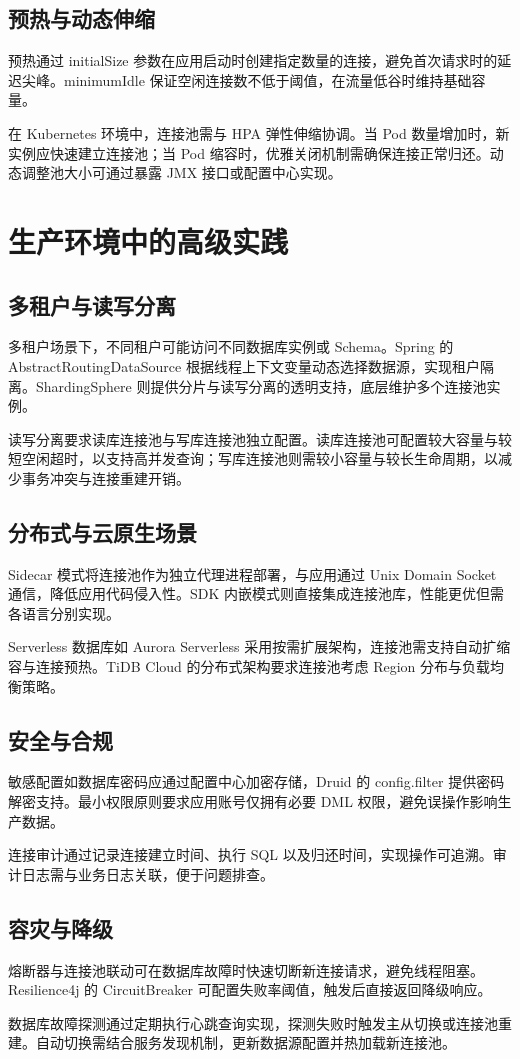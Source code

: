 \section{预热与动态伸缩}
预热通过 initialSize 参数在应用启动时创建指定数量的连接，避免首次请求时的延迟尖峰。minimumIdle 保证空闲连接数不低于阈值，在流量低谷时维持基础容量。\par
在 Kubernetes 环境中，连接池需与 HPA 弹性伸缩协调。当 Pod 数量增加时，新实例应快速建立连接池；当 Pod 缩容时，优雅关闭机制需确保连接正常归还。动态调整池大小可通过暴露 JMX 接口或配置中心实现。\par
\chapter{生产环境中的高级实践}
\section{多租户与读写分离}
多租户场景下，不同租户可能访问不同数据库实例或 Schema。Spring 的 AbstractRoutingDataSource 根据线程上下文变量动态选择数据源，实现租户隔离。ShardingSphere 则提供分片与读写分离的透明支持，底层维护多个连接池实例。\par
读写分离要求读库连接池与写库连接池独立配置。读库连接池可配置较大容量与较短空闲超时，以支持高并发查询；写库连接池则需较小容量与较长生命周期，以减少事务冲突与连接重建开销。\par
\section{分布式与云原生场景}
Sidecar 模式将连接池作为独立代理进程部署，与应用通过 Unix Domain Socket 通信，降低应用代码侵入性。SDK 内嵌模式则直接集成连接池库，性能更优但需各语言分别实现。\par
Serverless 数据库如 Aurora Serverless 采用按需扩展架构，连接池需支持自动扩缩容与连接预热。TiDB Cloud 的分布式架构要求连接池考虑 Region 分布与负载均衡策略。\par
\section{安全与合规}
敏感配置如数据库密码应通过配置中心加密存储，Druid 的 config.filter 提供密码解密支持。最小权限原则要求应用账号仅拥有必要 DML 权限，避免误操作影响生产数据。\par
连接审计通过记录连接建立时间、执行 SQL 以及归还时间，实现操作可追溯。审计日志需与业务日志关联，便于问题排查。\par
\section{容灾与降级}
熔断器与连接池联动可在数据库故障时快速切断新连接请求，避免线程阻塞。Resilience4j 的 CircuitBreaker 可配置失败率阈值，触发后直接返回降级响应。\par
数据库故障探测通过定期执行心跳查询实现，探测失败时触发主从切换或连接池重建。自动切换需结合服务发现机制，更新数据源配置并热加载新连接池。\par
